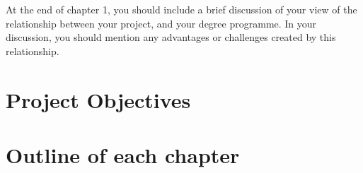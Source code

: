 At the end of chapter 1, you should include a brief discussion of your view of the relationship between your project, and your degree programme. In your discussion, you should mention any advantages or challenges created by this relationship. 
 \section{Project Objectives}
 \section{Outline of each chapter}


